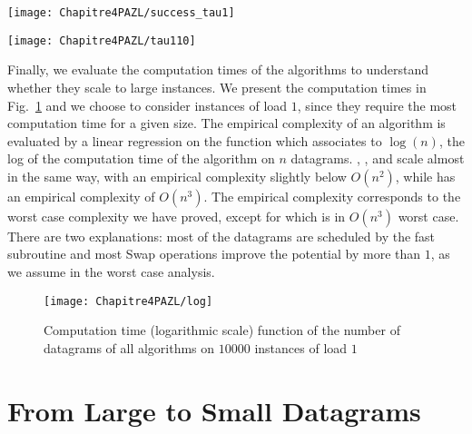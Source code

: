 \begin{minipage}[c]{.49\linewidth} 
\begin{center} 
\texttt{[image: Chapitre4PAZL/success\_tau1]} 
\end{center}
\label{fig:tau1}
\end{minipage}
\begin{minipage}[c]{.45\linewidth} 

\begin{center}
\texttt{[image: Chapitre4PAZL/tau110]}
\end{center}
\label{fig:tau1-10mess}
\end{minipage}
 \vspace{1cm}

 Finally, we evaluate the computation times of the algorithms to understand whether they scale to large instances. We present the computation times in Fig.~\ref{fig:timelog} and we choose to consider instances of load $1$, since they require the most computation time for a given size. The empirical complexity of an algorithm is evaluated by a
 linear regression on the function which associates to $\log(n)$, the log of the computation time of the algorithm on $n$ datagrams.  \firstfit, \greedyuniform, \shortestlongest and \swapandmove scale almost in the same way, with an empirical complexity slightly below $O(n^2)$, while \greedypotential has an empirical complexity of $O(n^3)$. The empirical complexity corresponds to the worst case complexity we have proved, except for \swapandmove which is in $O(n^3)$ worst case. There are two explanations: most of the datagrams are scheduled by the fast \firstfit subroutine and most Swap operations improve the potential by more than $1$, as we assume in the worst case analysis.

\begin{figure}
 \begin{center}
\texttt{[image: Chapitre4PAZL/log]}
\end{center}
\caption{Computation time (logarithmic scale) function of the number of datagrams of all algorithms on $10000$ instances of load $1$}
\label{fig:timelog}
\end{figure}


\section{From Large to Small Datagrams}\label{sec:reduction}

